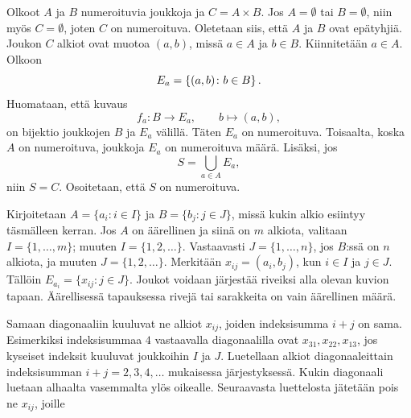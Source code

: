 \documentclass[11pt,a4paper]{amsart}
\begin{document}
\begin{solution}
Olkoot \(A\) ja \(B\) numeroituvia joukkoja ja \(C = A \times B\).
Jos \(A = \emptyset\) tai \(B = \emptyset\), niin myös
\(C = \emptyset\), joten \(C\) on numeroituva. Oletetaan siis, että
\(A\) ja \(B\) ovat epätyhjiä. Joukon
\(C\) alkiot ovat muotoa \((a, b)\), missä \(a \in A\) ja \(b \in
B\). Kiinnitetään \(a \in A\). Olkoon
\[
E_a = \left\lbrace(a, b) \colon b \in B\right\rbrace.
\]
Huomataan, että kuvaus
\[
f_a \colon B \to E_a, \qquad b \mapsto (a, b),
\]
on bijektio joukkojen
\(B\) ja \(E_a\) välillä. Täten \(E_a\) on numeroituva. Toisaalta, koska
\(A\) on numeroituva, joukkoja \(E_a\) on numeroituva määrä. Lisäksi, jos
\[
S = \bigcup_{a \in A} E_a,
\]
niin \(S = C\). Osoitetaan, että \(S\) on numeroituva.

Kirjoitetaan \(A = \{a_i \colon i \in I\}\) ja
\(B = \{b_j \colon j \in J\}\), missä kukin alkio esiintyy täsmälleen kerran.
Jos \(A\) on äärellinen ja siinä on \(m\) alkiota, valitaan
\(I = \{1, \ldots, m\}\); muuten \(I = \{1, 2, \ldots\}\).
Vastaavasti \(J = \{1, \ldots, n\}\), jos \(B\):ssä on \(n\) alkiota,
ja muuten \(J = \{1, 2, \ldots\}\).
Merkitään \(x_{ij} = (a_i, b_j)\), kun \(i \in I\) ja \(j \in J\).
Tällöin \(E_{a_i} = \{x_{ij} \colon j \in J\}\).
Joukot voidaan järjestää riveiksi alla olevan kuvion tapaan.
Äärellisessä tapauksessa rivejä tai sarakkeita on vain äärellinen määrä.
\begin{samepage}
\begin{center}
\end{center}
Samaan diagonaaliin kuuluvat ne alkiot \(x_{ij}\), joiden indeksisumma
\(i+j\) on sama. Esimerkiksi indeksisummaa \(4\) vastaavalla diagonaalilla
ovat \(x_{31}, x_{22}, x_{13}\), jos kyseiset indeksit kuuluvat joukkoihin
\(I\) ja \(J\). Luetellaan alkiot diagonaaleittain indeksisumman
\(i+j = 2, 3, 4, \ldots\) mukaisessa järjestyksessä.
Kukin diagonaali luetaan alhaalta vasemmalta ylös oikealle.
Seuraavasta luettelosta jätetään pois ne \(x_{ij}\), joille

\end{samepage}
\end{solution}
\end{document}
